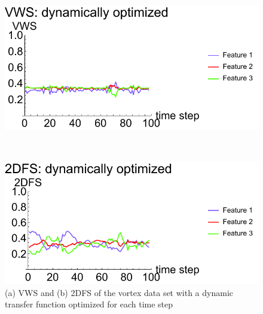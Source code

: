 \begin{figure}
	\centering
	\begin{minipage}{.5\textwidth}
		\includegraphics[width=1\linewidth]{figures/vorts_optimized_parallelsearch_VWS}
		\subcaption{}
	\end{minipage}~
	\begin{minipage}{.5\textwidth}
		\includegraphics[width=1\linewidth]{figures/vorts_optimized_parallelsearch_2DFS}
		\subcaption{}
	\end{minipage}
	\caption{(a) VWS and (b) 2DFS of the vortex data set with a dynamic transfer function optimized for each time step}
	\label{fig:vorts_dynamic}
\end{figure}

